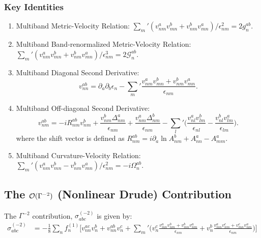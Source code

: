 \documentclass[twocolumn, prx, reprint, amsfonts, amsmath, amssymb, longbibliography, floatfix, aps]{revtex4-2}
\begin{document}
\subsubsection*{Key Identities}
\begin{enumerate}
	\item Multiband Metric-Velocity Relation: $\sum_{m}'(v^{a}_{nm}v^b_{mn} +  v^b_{nm}v^a_{mn})/\epsilon^2_{nm} =  2g^{ab}_{n}$.
	\item Multiband Band-renormalized Metric-Velocity Relation: $\sum_{m}'(v^{a}_{nm}v^b_{mn} +  v^b_{nm}v^a_{mn})/\epsilon^3_{nm} =  2\mathcal{G}^{ab}_{n}$.
	\item Multiband Diagonal Second Derivative:
    \begin{equation}
		v^{ab}_{nn} = \partial_a \partial_b \epsilon_n - {\textstyle \sum_{m}'}\frac{v^a_{nm}v^b_{mn} + v^b_{nm}v^a_{mn}}{\epsilon_{nm}}.
	\end{equation}
	
	\item Multiband Off-diagonal Second Derivative:
	\begin{equation}
		v^{ab}_{nm} = -iR^{ab}_{nm}v^b_{nm} + \frac{v^b_{nm}\Delta^a_{nm}}{\epsilon_{nm}} + \frac{v^a_{nm}\Delta^b_{nm}}{\epsilon_{nm}} - 
        {\textstyle \sum_{l}'}
        \Big(\frac{v^a_{nl} v^b_{lm}}{\epsilon_{nl}} - \frac{v^b_{nl}v^a_{lm}}{\epsilon_{lm}}\Big).
	\end{equation}
	where the shift vector is defined as $R^{ab}_{nm} = i\partial_{a} \ln A^{b}_{nm} + A^{a}_{nn} - A^{a}_{mm}$.
	
	\item Multiband Curvature-Velocity Relation: $\sum_{m}'(v^{a}_{nm}v^b_{mn} -  v^b_{nm}v^a_{mn})/\epsilon^2_{nm} =  -i\Omega^{ab}_{n}$.
\end{enumerate}


\subsection{The \texorpdfstring{${\cal O}(\Gamma^{-2})$}{O(Gamma-2)} (Nonlinear Drude) Contribution}
The $\Gamma^{-2}$ contribution, $\sigma^{(-2)}_{abc}$ is given by:
\begin{equation}
	\begin{aligned}
		\sigma^{(-2)}_{abc} & =-\frac{1}{8}
        {\textstyle \sum_{n}}f^{(1)}_n \Big[ v^{ac}_{nn}v^b_{n} + v^{ab}_{nn}v^c_{n} + 
        {\textstyle \sum_{m}'}
        \Big( v^c_{n}\frac{v^{a}_{mn}v^{b}_{nm} + v^{b}_{mn}v^{a}_{nm}}{\epsilon_{nm}} + v^b_{n}\frac{v^{a}_{mn}v^{c}_{nm} + v^{c}_{mn}v^{a}_{nm}}{\epsilon_{nm}}\Big) \Big]\\ 
	\end{aligned}
\end{equation}
\end{document}
